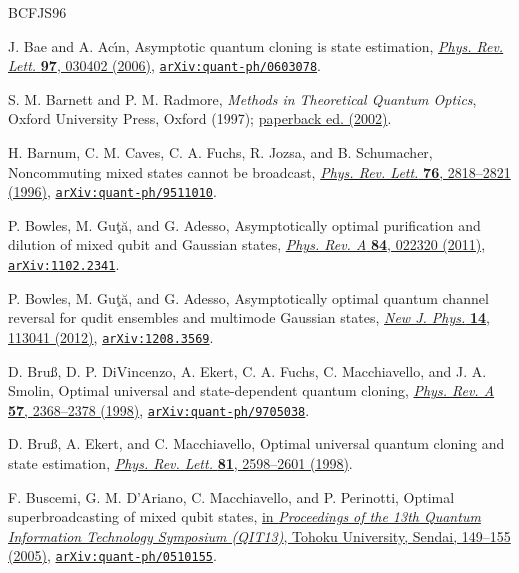 \documentclass[11pt]{article}
\theoremstyle{remark}
\theoremstyle{plain}
\newcommand{\doi}[2]{\href{https://doi.org/#1}{#2}}
\newcommand{\arxiv}[1]{\href{https://arxiv.org/abs/#1}{\texttt{arXiv:#1}}}
\begin{document}
\begin{thebibliography}{BCFJS96}

J. Bae and A. Ac\'{\i}n,
Asymptotic quantum cloning is state estimation,
\doi{10.1103/PhysRevLett.97.030402}{\emph{Phys. Rev. Lett.} \textbf{97}, 030402 (2006)},
\arxiv{quant-ph/0603078}.

S. M. Barnett and P. M. Radmore,
\emph{Methods in Theoretical Quantum Optics},
Oxford University Press, Oxford (1997);
\doi{10.1093/acprof:oso/9780198563617.001.0001}{paperback ed. (2002)}.

H. Barnum, C. M. Caves, C. A. Fuchs, R. Jozsa, and B. Schumacher,
Noncommuting mixed states cannot be broadcast,
\doi{10.1103/PhysRevLett.76.2818}{\emph{Phys. Rev. Lett.} \textbf{76}, 2818--2821 (1996)},
\arxiv{quant-ph/9511010}.

P. Bowles, M. Gu{\c t}{\u a}, and G. Adesso,
Asymptotically optimal purification and dilution of mixed qubit and Gaussian states,
\doi{10.1103/PhysRevA.84.022320}{\emph{Phys. Rev. A} \textbf{84}, 022320 (2011)},
\arxiv{1102.2341}.

P. Bowles, M. Gu{\c t}{\u a}, and G. Adesso,
Asymptotically optimal quantum channel reversal for qudit ensembles and multimode Gaussian states,
\doi{10.1088/1367-2630/14/11/113041}{\emph{New J. Phys.} \textbf{14}, 113041 (2012)},
\arxiv{1208.3569}.

D. Bru{\ss}, D. P. DiVincenzo, A. Ekert, C. A. Fuchs, C. Macchiavello, and J. A. Smolin,
Optimal universal and state-dependent quantum cloning,
\doi{10.1103/PhysRevA.57.2368}{\emph{Phys. Rev. A} \textbf{57}, 2368--2378 (1998)},
\arxiv{quant-ph/9705038}.

D. Bru{\ss}, A. Ekert, and C. Macchiavello,
Optimal universal quantum cloning and state estimation,
\doi{10.1103/PhysRevLett.81.2598}{\emph{Phys. Rev. Lett.} \textbf{81}, 2598--2601 (1998)}.

F. Buscemi, G. M. D'Ariano, C. Macchiavello, and P. Perinotti,
Optimal superbroadcasting of mixed qubit states,
\href{https://wordpress.qubit.it/wp-content/uploads/publications-dariano/sendai_proc05-printed.pdf}{in
\emph{Proceedings of the 13th Quantum Information Technology Symposium
(QIT13)}, Tohoku University, Sendai, 149--155 (2005)},
\arxiv{quant-ph/0510155}.


\end{thebibliography}
\end{document}
